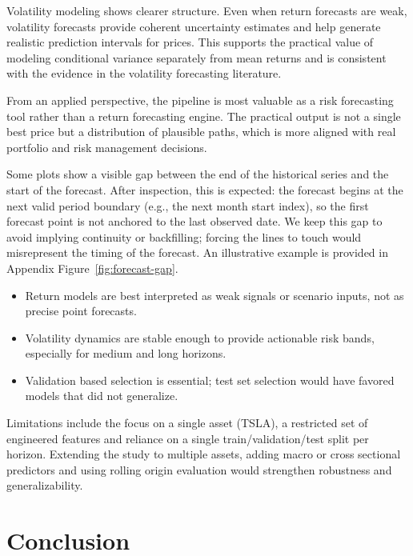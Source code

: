 \documentclass[11pt,a4paper]{article}
\begin{document}
\noindent Volatility modeling shows clearer structure. Even when return forecasts are weak, volatility forecasts provide coherent uncertainty estimates and help generate realistic prediction intervals for prices. This supports the practical value of modeling conditional variance separately from mean returns and is consistent with the evidence in the volatility forecasting literature.

\noindent From an applied perspective, the pipeline is most valuable as a risk forecasting tool rather than a return forecasting engine. The practical output is not a single best price but a distribution of plausible paths, which is more aligned with real portfolio and risk management decisions.

\noindent Some plots show a visible gap between the end of the historical series and the start of the forecast. After inspection, this is expected: the forecast begins at the next valid period boundary (e.g., the next month start index), so the first forecast point is not anchored to the last observed date. We keep this gap to avoid implying continuity or backfilling; forcing the lines to touch would misrepresent the timing of the forecast. An illustrative example is provided in Appendix Figure~\ref{fig:forecast-gap}.

\begin{itemize}
\setlength{\itemsep}{0.1\baselineskip}
    \item Return models are best interpreted as weak signals or scenario inputs, not as precise point forecasts.
    \item Volatility dynamics are stable enough to provide actionable risk bands, especially for medium and long horizons.
    \item Validation based selection is essential; test set selection would have favored models that did not generalize.
\end{itemize}

Limitations include the focus on a single asset (TSLA), a restricted set of engineered features and reliance on a single train/validation/test split per horizon. Extending the study to multiple assets, adding macro or cross sectional predictors and using rolling origin evaluation would strengthen robustness and generalizability.
\endgroup

\section{Conclusion}
\label{sec:conclusion}
\end{document}
